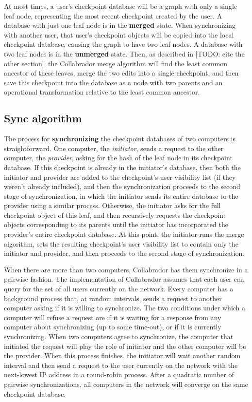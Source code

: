 \documentclass[11pt,titlepage]{article}
\begin{document}
At most times, a user's checkpoint database will be a graph with only
a single leaf node, representing the most recent checkpoint created by
the user. A database with just one leaf node is in the \textbf{merged}
state. When synchronizing with another user, that user's checkpoint
objects will be copied into the local checkpoint database, causing the
graph to have two leaf nodes. A database with two leaf nodes is in the
\textbf{unmerged} state. Then, as described in [TODO: cite the other
section], the Collabrador merge algorithm will find the least common
ancestor of these leaves, merge the two edits into a single
checkpoint, and then save this checkpoint into the database as a node
with two parents and an operational transformation relative to the
least common ancestor.

\subsection{Sync algorithm}

The process for \textbf{synchronizing} the checkpoint databases of two
computers is straightforward. One computer, the \emph{initiator},
sends a request to the other computer, the \emph{provider}, asking for
the hash of the leaf node in its checkpoint database. If this
checkpoint is already in the initiator's database, then both the
initiator and provider are added to the checkpoint's user visibility
list (if they weren't already included), and then the synchronization
proceeds to the second stage of synchronization, in which the
initiator sends its entire database to the provider using a similar
process. Otherwise, the initiator asks for the full checkpoint object
of this leaf, and then recursively requests the checkpoint objects
corresponding to its parents until the initiator has incorporated the
provider's entire checkpoint database. At this point, the initiator
runs the merge algorithm, sets the resulting checkpoint's user
visibility list to contain only the initiator and provider, and then
proceeds to the second stage of synchronization.

When there are more than two computers, Collabrador has them
synchronize in a pairwise fashion. The implementation of Collabrador
assumes that each user can query for the set of all users currently on
the network. Every computer has a background process that, at random
intervals, sends a request to another computer asking if it is willing
to synchronize. The two conditions under which a computer will refuse
a request are if it is waiting for a response from any computer about
synchronizing (up to some time-out), or if it is currently
synchronizing. When two computers agree to synchronize, the computer
that initiated the request will play the role of initiator and the
other computer will be the provider. When this process finishes, the
initiator will wait another random interval and then send a request to
the user currently on the network with the next-lowest IP address in a
round-robin process. After a quadratic number of pairwise
synchronizations, all computers in the network will converge on the
same checkpoint database.
\end{document}
